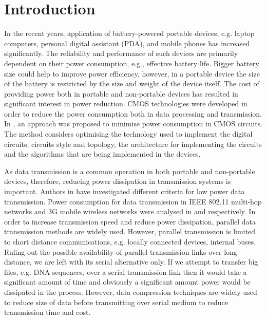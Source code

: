 \documentclass[preprint,12pt]{elsarticle}
\begin{document}
\section{Introduction}
In the recent years, application of battery-powered portable devices, e.g. laptop computers, personal digital assistant (PDA),  and mobile phones has increased significantly. The reliability and performance of such devices are primarily dependent  on their power consumption, e.g., effective battery life. Bigger battery size could help to improve power efficiency, however, in a portable device the size of the battery is restricted by the size and weight of the device itself. The cost of providing power both in portable and non-portable devices has resulted in significant interest in power reduction. CMOS technologies were developed in order to reduce the power consumption both in data processing and transmission. In \cite{chandrakasan1995}, an approach was proposed to minimise power consumption in CMOS circuits. The method considers optimising the technology used to implement the digital circuits, circuits style and topology, the architecture for implementing the circuits and the algorithms that are being implemented in the devices.

As data transmission is a common operation in both portable and non-portable devices, therefore, reducing power dissipation in transmission systems is important. Authors in \cite{Gregori2004,Yates04} have investigated different criteria for low power data transmission. Power consumption for data transmission in IEEE 802.11 multi-hop networks and 3G mobile wireless networks were analysed in \cite{Le11} and \cite{toorisaka12} respectively.  In order to increase transmission speed and reduce power dissipation, parallel data transmission methods are widely used. However, parallel transmission is limited to short distance communications, e.g. locally connected devices, internal buses. Ruling out the possible availability of parallel transmission links over long distance, we are left with its serial alternative only. If we attempt to transfer big files, e.g. DNA sequences, over a serial transmission link then it would take a significant amount of time and obviously a significant amount power would be dissipated in the process. However, data compression techniques are widely used to reduce size of data before transmitting over serial medium to reduce transmission time and cost.
\end{document}

